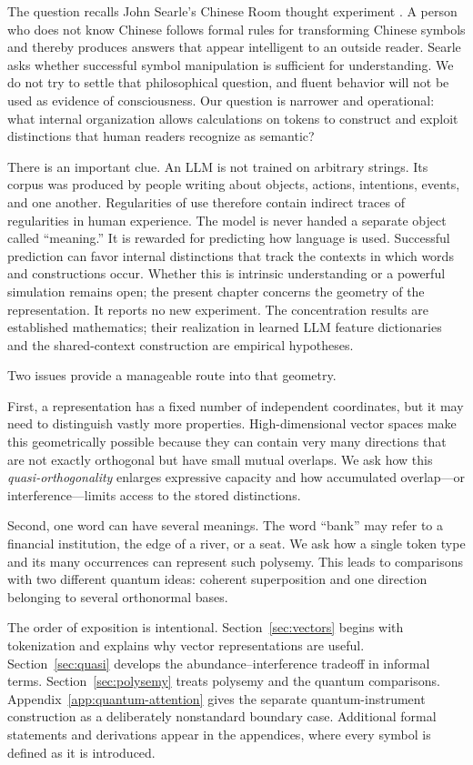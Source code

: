 \documentclass[
  aps,
  reprint,
  superscriptaddress,
  floatfix,
  nofootinbib,
  longbibliography
]{revtex4-2}
\begin{document}
The question recalls John Searle's Chinese Room thought experiment
\cite{searl-80a}.  A person who does not know Chinese follows formal rules for
transforming Chinese symbols and thereby produces answers that appear
intelligent to an outside reader.  Searle asks whether successful symbol
manipulation is sufficient for understanding.  We do not try to settle that
philosophical question, and fluent behavior will not be used as evidence of
consciousness.  Our question is narrower and operational: what internal
organization allows calculations on tokens to construct and exploit distinctions that
human readers recognize as semantic?

There is an important clue.  An LLM is not trained on arbitrary strings.
Its corpus was produced by people writing about objects, actions, intentions,
events, and one another.  Regularities of use therefore contain indirect
traces of regularities in human experience.  The model is never handed a
separate object called ``meaning.''  It is rewarded for predicting how
language is used.  Successful prediction can favor internal distinctions that
track the contexts in which words and constructions occur.  Whether this is
intrinsic understanding or a powerful simulation remains open; the present
chapter concerns the geometry of the representation.  It reports no new
experiment.  The concentration results are established mathematics; their
realization in learned LLM feature dictionaries and the shared-context
construction are empirical hypotheses.

Two issues provide a manageable route into that geometry.

First, a representation has a fixed number of independent coordinates, but it
may need to distinguish vastly more properties.  High-dimensional vector
spaces make this geometrically possible because they can contain very many directions that
are not exactly orthogonal but have small mutual overlaps.  We ask how this
\emph{quasi-orthogonality} enlarges expressive capacity and how accumulated
overlap---or interference---limits access to the stored distinctions.

Second, one word can have several meanings.  The word ``bank'' may refer to a
financial institution, the edge of a river, or a seat.  We ask how a single
token type and its many occurrences can represent such polysemy.  This leads
to comparisons with two different quantum ideas: coherent superposition and
one direction belonging to several orthonormal bases.

The order of exposition is intentional.  Section~\ref{sec:vectors} begins
with tokenization and explains why vector representations are useful.
Section~\ref{sec:quasi} develops the abundance--interference tradeoff in
informal terms.  Section~\ref{sec:polysemy} treats polysemy and the quantum
comparisons.  Appendix~\ref{app:quantum-attention} gives the separate
quantum-instrument construction as a deliberately nonstandard
boundary case.  Additional formal statements and derivations appear in the
appendices, where every symbol is defined as it is introduced.
\end{document}
